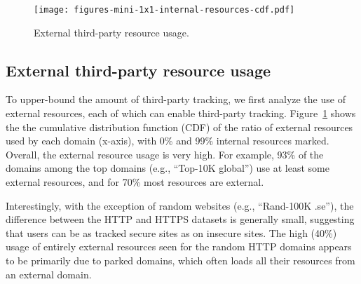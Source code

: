 \documentclass[letterpaper]{sig-alternate-10pt}
\begin{document}

\begin{figure}[t]
\texttt{[image: figures-mini-1x1-internal-resources-cdf.pdf]}
\vspace{-22pt}
\caption{External third-party resource usage.}
\label{fig:external}
\vspace{-16pt}
\end{figure}

\subsection{External third-party resource usage}

To upper-bound the amount of third-party tracking, 
we first analyze the use of external resources, each of which can enable third-party tracking.
Figure~\ref{fig:external} shows the the cumulative distribution function (CDF)
of the ratio of external resources used by each domain (x-axis), with 0\% and 99\% internal resources marked.
Overall, the external resource usage is very high.
For example, 93\% of the domains among the top domains (e.g., ``Top-10K global'') 
use at least some external resources, 
and for 70\% 
most 
resources are external.

Interestingly, with the exception of random websites (e.g., ``Rand-100K .se''),
the difference between the HTTP and HTTPS datasets is generally small,
suggesting that users can be as tracked secure sites as on insecure sites.
The high (40\%) usage of entirely external resources seen for the
random HTTP domains appears to be primarily due to parked domains,
which often loads all their resources from an external domain.

\end{document}
